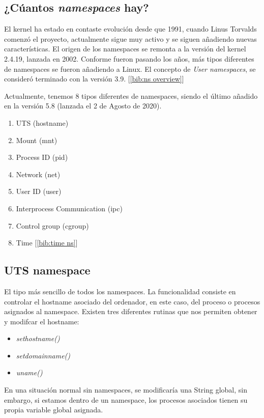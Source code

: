 \documentclass[12pt]{article}
\begin{document}
	\subsection{¿Cúantos \textit{namespaces} hay?}
	\par\noindent El kernel ha estado en contaste evolución desde que 1991, cuando Linus Torvalds comenzó el proyecto, actualmente sigue muy activo y se siguen añadiendo nuevas características. El origen de los namespaces se remonta a la versión del kernel 2.4.19, lanzada en 2002. Conforme fueron pasando los años, más tipos diferentes de namespaces se fueron añadiendo a Linux. El concepto de \textit{User namespaces}, se consideró terminado con la versión 3.9. [\ref{bib:ns overview}]\\
	\par \noindent Actualmente, tenemos 8 tipos diferentes de namespaces, siendo el último añadido en la versión 5.8 (lanzada el 2 de Agosto de 2020). 
	
	\begin{enumerate}
		\item UTS (hostname)
		\item Mount (mnt)
		\item Process ID (pid)
		\item Network (net)
		\item User ID (user) 
		\item Interprocess Communication (ipc)
		\item Control group (cgroup)
		\item Time [\ref{bib:time ns}]
	\end{enumerate}
	
	\pagebreak
	
	\subsection{UTS namespace}
	\label{sect: uts namespace}
	\par \noindent El tipo más sencillo de todos los namespaces. La funcionalidad consiste en controlar el hostname asociado del ordenador, en este caso, del proceso o procesos asignados al namespace. Existen tres diferentes rutinas que nos permiten obtener y modifcar el hostname: 
	\begin{itemize}
		\item \textit{sethostname()}
		\item \textit{setdomainname()}
		\item \textit{uname()}
	\end{itemize}
	En una situación normal sin namespaces, se modificaría una String global, sin embargo, si estamos dentro de un namespace, los procesos asociados tienen su propia variable global asignada.\\
	
\end{document}
